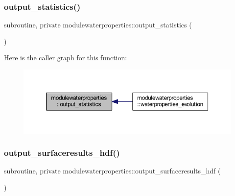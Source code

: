 \subsubsection{\texorpdfstring{output\+\_\+statistics()}{output\_statistics()}}
{\footnotesize\ttfamily subroutine, private modulewaterproperties\+::output\+\_\+statistics (\begin{DoxyParamCaption}{ }\end{DoxyParamCaption})\hspace{0.3cm}{\ttfamily [private]}}

Here is the caller graph for this function\+:\nopagebreak
\begin{figure}[H]
\begin{center}
\leavevmode
\includegraphics[width=350pt]{namespacemodulewaterproperties_ae4782724563831422008fbeb12c51841_icgraph}
\end{center}
\end{figure}
\mbox{\label{namespacemodulewaterproperties_a3c8948249582551960c897355058c5f0}} 
\subsubsection{\texorpdfstring{output\+\_\+surfaceresults\+\_\+hdf()}{output\_surfaceresults\_hdf()}}
{\footnotesize\ttfamily subroutine, private modulewaterproperties\+::output\+\_\+surfaceresults\+\_\+hdf (\begin{DoxyParamCaption}{ }\end{DoxyParamCaption})\hspace{0.3cm}{\ttfamily [private]}}

